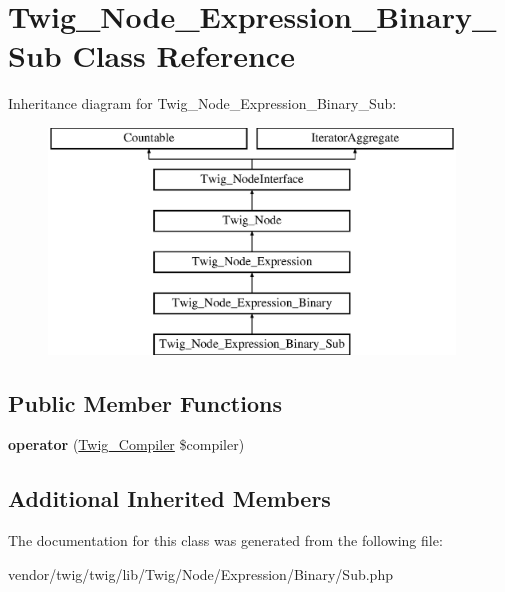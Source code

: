 \hypertarget{classTwig__Node__Expression__Binary__Sub}{}\section{Twig\+\_\+\+Node\+\_\+\+Expression\+\_\+\+Binary\+\_\+\+Sub Class Reference}
\label{classTwig__Node__Expression__Binary__Sub}
Inheritance diagram for Twig\+\_\+\+Node\+\_\+\+Expression\+\_\+\+Binary\+\_\+\+Sub\+:\begin{figure}[H]
\begin{center}
\leavevmode
\includegraphics[height=6.000000cm]{classTwig__Node__Expression__Binary__Sub}
\end{center}
\end{figure}
\subsection*{Public Member Functions}
\begin{DoxyCompactItemize}
\item 
{\bfseries operator} (\hyperlink{classTwig__Compiler}{Twig\+\_\+\+Compiler} \$compiler)\hypertarget{classTwig__Node__Expression__Binary__Sub_a513dcc156f5e15d685920791d443911a}{}\label{classTwig__Node__Expression__Binary__Sub_a513dcc156f5e15d685920791d443911a}

\end{DoxyCompactItemize}
\subsection*{Additional Inherited Members}


The documentation for this class was generated from the following file\+:\begin{DoxyCompactItemize}
\item 
vendor/twig/twig/lib/\+Twig/\+Node/\+Expression/\+Binary/Sub.\+php\end{DoxyCompactItemize}
